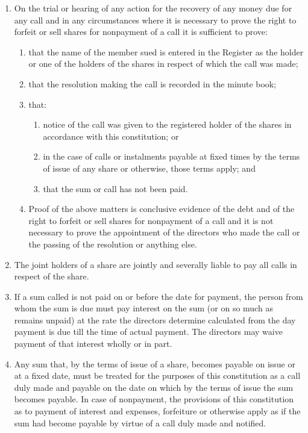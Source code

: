\begin{enumerate}[label=(\alph*)]
    \item On the trial or hearing of any action for the recovery of any money due for any call and in any circumstances where it is necessary to prove the right to forfeit or sell shares for nonpayment of a call it is sufficient to prove:
    \begin{enumerate}[label=(\roman*)]
        \item that the name of the member sued is entered in the Register as the holder or one of the holders of the shares in respect of which the call was made;
        \item that the resolution making the call is recorded in the minute book;
        \item that:
        \begin{enumerate}[label=(\alph*)]
            \item notice of the call was given to the registered holder of the shares in accordance with this constitution; or
            \item in the case of calls or instalments payable at fixed times by the terms of issue of any share or otherwise, those terms apply; and
            \item that the sum or call has not been paid.
        \end{enumerate}
        \item Proof of the above matters is conclusive evidence of the debt and of the right to forfeit or sell shares for nonpayment of a call and it is not necessary to prove the appointment of the directors who made the call or the passing of the resolution or anything else.
    \end{enumerate}
    
    \item The joint holders of a share are jointly and severally liable to pay all calls in respect of the share.
    
    \item If a sum called is not paid on or before the date for payment, the person from whom the sum is due must pay interest on the sum (or on so much as remains unpaid) at the rate the directors determine calculated from the day payment is due till the time of actual payment. The directors may waive payment of that interest wholly or in part.
    
    \item Any sum that, by the terms of issue of a share, becomes payable on issue or at a fixed date, must be treated for the purposes of this constitution as a call duly made and payable on the date on which by the terms of issue the sum becomes payable. In case of nonpayment, the provisions of this constitution as to payment of interest and expenses, forfeiture or otherwise apply as if the sum had become payable by virtue of a call duly made and notified.
    

\end{enumerate}
